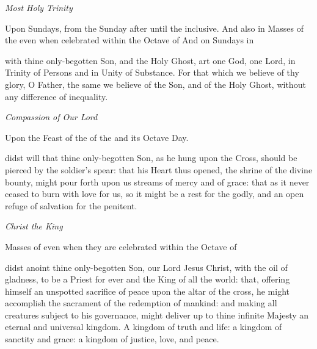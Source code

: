 \begin{multicols}{2}
\centerline{\textit{Most Holy Trinity}}
\begin{rubric}
	Upon Sundays, from the  Sunday after  until the  inclusive. And also in Masses of the  even when celebrated within the Octave of  And on Sundays in 
\end{rubric}
 with thine only-begotten Son, and the Holy Ghost, art one God, one Lord, in Trinity of Persons and in Unity of Substance. For that which we believe of thy glory, O Father, the same we believe of the Son, and of the Holy Ghost, without any difference of inequality.\\

\centerline{\textit{Compassion of Our Lord}}
\begin{rubric}
	Upon the Feast of the of the  and its Octave Day.
\end{rubric}
 didst will that thine only-begotten Son, as he hung upon the Cross, should be pierced by the soldier's spear: that his Heart thus opened, the shrine of the divine bounty, might pour forth upon us streams of mercy and of grace: that as it never ceased to burn with love for us, so it might be a rest for the godly, and an open refuge of salvation for the penitent.\\

\centerline{\textit{Christ the King}}
\begin{rubric}
	Masses of  even when they are celebrated within the Octave of 
\end{rubric}
 didst anoint thine only-begotten Son, our Lord Jesus Christ, with the oil of gladness, to be a Priest for ever and the King of all the world: that, offering himself an unspotted sacrifice of peace upon the altar of the cross, he might accomplish the sacrament of the redemption of mankind: and making all creatures subject to his governance, might deliver up to thine infinite Majesty an eternal and universal kingdom. A kingdom of truth and life: a kingdom of sanctity and grace: a kingdom of justice, love, and peace.\\


\end{multicols}
